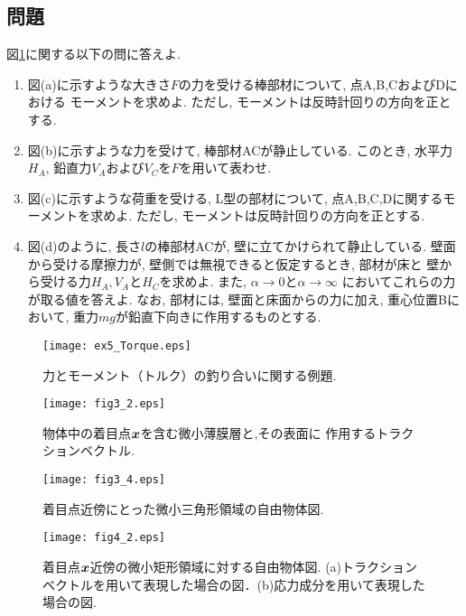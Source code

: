 \documentclass[10pt,a4j]{jarticle}
\begin{document}
\subsection{問題}
図\ref{fig:ex5_Torque}に関する以下の問に答えよ.
\begin{enumerate}
\item
図(a)に示すような大きさ$F$の力を受ける棒部材について, 点A,B,CおよびDにおける
モーメントを求めよ. ただし, モーメントは反時計回りの方向を正とする. 
\item
図(b)に示すような力を受けて, 棒部材ACが静止している. このとき, 水平力$H_A$, 
鉛直力$V_A$および$V_C$を$F$を用いて表わせ. 
\item
図(c)に示すような荷重を受ける, L型の部材について, 点A,B,C,Dに関するモーメントを求めよ. 
ただし, モーメントは反時計回りの方向を正とする. 
\item
図(d)のように, 長さ$l$の棒部材ACが, 壁に立てかけられて静止している. 
壁面から受ける摩擦力が, 壁側では無視できると仮定するとき, 部材が床と
壁から受ける力$H_A, V_A$と$H_C$を求めよ. また, $\alpha\rightarrow 0$と$\alpha \rightarrow \infty$
においてこれらの力が取る値を答えよ. なお, 部材には, 壁面と床面からの力に加え, 
重心位置Bにおいて, 重力$mg$が鉛直下向きに作用するものとする. 
\end{enumerate}
\begin{figure}[h]
	\begin{center}
	\texttt{[image: ex5\_Torque.eps]} 
	\end{center}
	\caption{力とモーメント（トルク）の釣り合いに関する例題.} 
	\label{fig:ex5_Torque}
\end{figure}
\begin{figure}[h]
	\begin{center}
	\texttt{[image: fig3\_2.eps]} 
	\end{center}
	\caption{物体中の着目点$\mbox{\boldmath $x$}$を含む微小薄膜層と,その表面に
	作用するトラクションベクトル. } 
	\label{fig:fig3_2}
\end{figure}
\begin{figure}[h]
	\begin{center}
	\texttt{[image: fig3\_4.eps]} 
	\end{center}
	\caption{着目点近傍にとった微小三角形領域の自由物体図.}
	\label{fig:fig3_4}
\end{figure}
\begin{figure}[h]
	\begin{center}
	\texttt{[image: fig4\_2.eps]} 
	\end{center}
	\caption{着目点$\mbox{\boldmath $x$}$近傍の微小矩形領域に対する自由物体図.
	(a)トラクションベクトルを用いて表現した場合の図．(b)応力成分を用いて表現した場合の図.} 
	\label{fig:fig4_1}
\end{figure}
\end{document}

